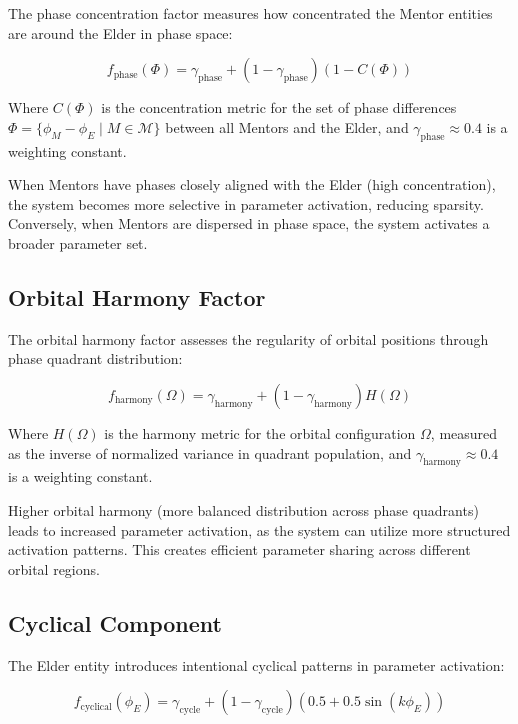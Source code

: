 The phase concentration factor measures how concentrated the Mentor entities are around the Elder in phase space:

\begin{equation}
f_{\text{phase}}(\Phi) = \gamma_{\text{phase}} + (1 - \gamma_{\text{phase}})(1 - C(\Phi))
\end{equation}

Where $C(\Phi)$ is the concentration metric for the set of phase differences $\Phi = \{\phi_M - \phi_E \mid M \in \mathcal{M}\}$ between all Mentors and the Elder, and $\gamma_{\text{phase}} \approx 0.4$ is a weighting constant.

When Mentors have phases closely aligned with the Elder (high concentration), the system becomes more selective in parameter activation, reducing sparsity. Conversely, when Mentors are dispersed in phase space, the system activates a broader parameter set.

\subsection{Orbital Harmony Factor}

The orbital harmony factor assesses the regularity of orbital positions through phase quadrant distribution:

\begin{equation}
f_{\text{harmony}}(\Omega) = \gamma_{\text{harmony}} + (1 - \gamma_{\text{harmony}})H(\Omega)
\end{equation}

Where $H(\Omega)$ is the harmony metric for the orbital configuration $\Omega$, measured as the inverse of normalized variance in quadrant population, and $\gamma_{\text{harmony}} \approx 0.4$ is a weighting constant.

Higher orbital harmony (more balanced distribution across phase quadrants) leads to increased parameter activation, as the system can utilize more structured activation patterns. This creates efficient parameter sharing across different orbital regions.

\subsection{Cyclical Component}

The Elder entity introduces intentional cyclical patterns in parameter activation:

\begin{equation}
f_{\text{cyclical}}(\phi_E) = \gamma_{\text{cycle}} + (1 - \gamma_{\text{cycle}})(0.5 + 0.5\sin(k\phi_E))
\end{equation}

